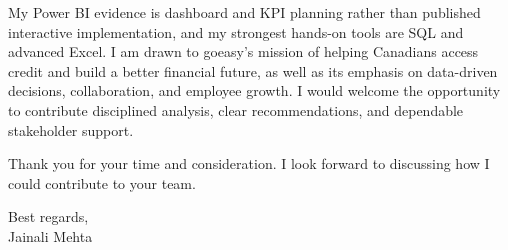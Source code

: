 \documentclass[letterpaper,10pt]{article}
\begin{document}
My Power BI evidence is dashboard and KPI planning rather than published interactive implementation, and my strongest hands-on tools are SQL and advanced Excel. I am drawn to goeasy's mission of helping Canadians access credit and build a better financial future, as well as its emphasis on data-driven decisions, collaboration, and employee growth. I would welcome the opportunity to contribute disciplined analysis, clear recommendations, and dependable stakeholder support.

Thank you for your time and consideration. I look forward to discussing how I could contribute to your team.

Best regards,\\[8pt]
Jainali Mehta
\end{document}
